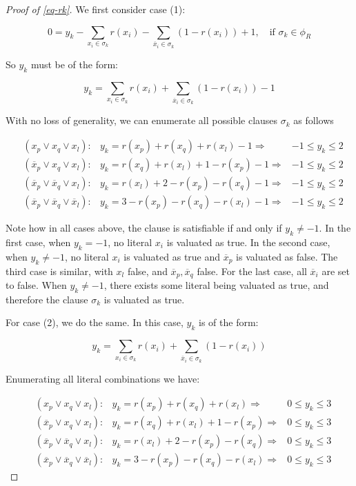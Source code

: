 \documentclass{amsart}
\newcommand{\ov}{\overline}
\theoremstyle{plain}
\renewcommand{\implies}{\Rightarrow}
\begin{document}
\begin{proof}[Proof of \autoref{eq-rk}]
  We first consider case (1):

  \begin{equation*}
    0 = y_k-\sum_{x_i\in\sigma_k} r(x_i)-\sum_{\ov{x}_i\in\sigma_k} (1-r(x_i))+1,\quad\text{if }
    \sigma_k\in\phi_R
  \end{equation*}

  So $y_k$ must be of the form:

  \begin{equation*}
    y_k=\sum_{x_i\in\sigma_k} r(x_i)+\sum_{\ov{x}_i\in\sigma_k} (1-r(x_i))-1
  \end{equation*}

  With no loss of generality, we can enumerate all possible clauses $\sigma_k$ as follows

  \begin{align*}
    &(x_p\vee x_q\vee x_l): &y_k=r(x_p)+r(x_q)+r(x_l)-1\implies &-1\leq y_k\leq 2\\
    &(\ov{x}_p\vee x_q\vee x_l): &y_k=r(x_q)+r(x_l)+1-r(x_p)-1\implies &-1\leq y_k\leq 2\\
    &(\ov{x}_p\vee\ov{x}_q\vee x_l):&y_k=r(x_l)+2-r(x_p)-r(x_q)-1\implies &-1\leq y_k\leq 2\\
    &(\ov{x}_p\vee\ov{x}_q\vee\ov{x}_l):&y_k=3-r(x_p)-r(x_q)-r(x_l)-1\implies &-1\leq y_k\leq 2
  \end{align*}

  Note how in all cases above, the clause is satisfiable if and only if $y_k\neq -1$. In the first
  case, when $y_k=-1$, no literal $x_i$ is valuated as true. In the second case, when $y_k\neq -1$,
  no literal $x_i$ is valuated as true and $\ov{x}_p$ is valuated as false. The third case is
  similar, with $x_l$ false, and $\ov{x}_p,\ov{x}_q$ false. For the last case, all $\ov{x}_i$ are
  set to false. When $y_k\neq -1$, there exists some literal being valuated as true, and therefore
  the clause $\sigma_k$ is valuated as true.

  For case (2), we do the same. In this case, $y_k$ is of the form:

  \begin{equation*}
    y_k=\sum_{x_i\in\sigma_k} r(x_i)+\sum_{\ov{x}_i\in\sigma_k} (1-r(x_i))
  \end{equation*}

  Enumerating all literal combinations we have:

  \begin{align*}
    &(x_p\vee x_q\vee x_l): &y_k=r(x_p)+r(x_q)+r(x_l)\implies &0\leq y_k\leq 3\\
    &(\ov{x}_p\vee x_q\vee x_l): &y_k=r(x_q)+r(x_l)+1-r(x_p)\implies &0\leq y_k\leq 3\\
    &(\ov{x}_p\vee\ov{x}_q\vee x_l):&y_k=r(x_l)+2-r(x_p)-r(x_q)\implies &0\leq y_k\leq 3\\
    &(\ov{x}_p\vee\ov{x}_q\vee\ov{x}_l):&y_k=3-r(x_p)-r(x_q)-r(x_l)\implies &0\leq y_k\leq 3
  \end{align*}


\end{proof}
\end{document}
